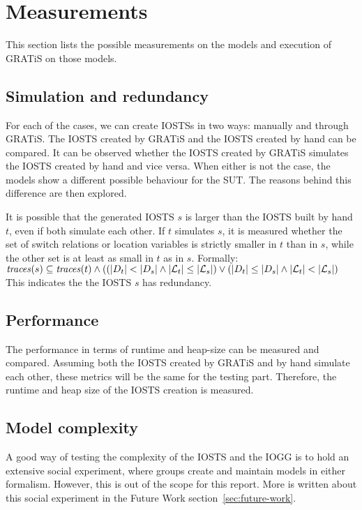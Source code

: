 \section{Measurements}\label{sec:measurements}

This section lists the possible measurements on the models and execution of GRATiS on those models.

\subsection{Simulation and redundancy}
For each of the cases, we can create IOSTSs in two ways: manually and through GRATiS. The IOSTS created by GRATiS and the IOSTS created by hand can be compared. It can be observed whether the IOSTS created by GRATiS simulates the IOSTS created by hand and vice versa. When either is not the case, the models show a different possible behaviour for the SUT. The reasons behind this difference are then explored. 

It is possible that the generated IOSTS $s$ is larger than the IOSTS built by hand $t$, even if both simulate each other. If $t$ simulates $s$, it is measured whether the set of switch relations or location variables is strictly smaller in $t$ than in $s$, while the other set is at least as small in $t$ as in $s$. Formally:
\vspace{5px} \\
$\mathit{traces}(s) \subseteq \mathit{traces}(t) \land ((|D_t| < |D_s| \land |\mathcal{L}_t| \leq |\mathcal{L}_s|) \lor (|D_t| \leq |D_s| \land |\mathcal{L}_t| < |\mathcal{L}_s|)$
\vspace{5px} \\
This indicates the the IOSTS $s$ has redundancy.

\subsection{Performance}
The performance in terms of runtime and heap-size can be measured and compared. Assuming both the IOSTS created by GRATiS and by hand simulate each other, these metrics will be the same for the testing part. Therefore, the runtime and heap size of the IOSTS creation is measured.

\subsection{Model complexity}\label{sec:complexity_measurement}
A good way of testing the complexity of the IOSTS and the IOGG is to hold an extensive social experiment, where groups create and maintain models in either formalism. However, this is out of the scope for this report. More is written about this social experiment in the Future Work section~\ref{sec:future-work}.

